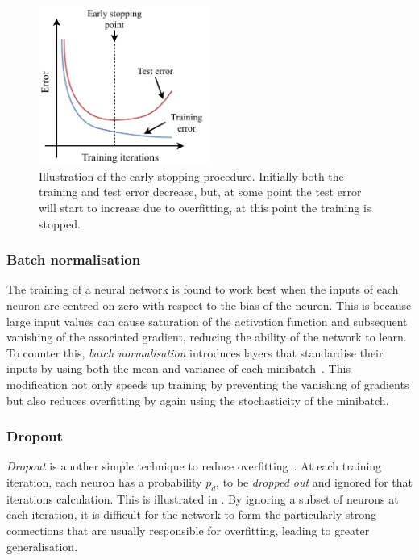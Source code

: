 \begin{figure} %
    \includegraphics[width=0.5\textwidth]{diagrams/6-cnn/early_stopping.pdf}
    \caption[Illustration of the early stopping procedure]
    {Illustration of the early stopping procedure. Initially both the training and test error
        decrease, but, at some point the test error will start to increase due to overfitting, at
        this point the training is stopped.}
    \label{fig:early_stopping}
\end{figure}

\subsubsection*{Batch normalisation} %

The training of a neural network is found to work best when the inputs of each neuron are centred
on zero with respect to the bias of the neuron. This is because large input values can cause
saturation of the activation function and subsequent vanishing of the associated gradient,
reducing the ability of the network to learn. To counter this, \emph{batch normalisation}
introduces layers that standardise their inputs by using both the mean and variance of each
minibatch~\cite{ioffe2015}. This modification not only speeds up training by preventing the
vanishing of gradients but also reduces overfitting by again using the stochasticity of the
minibatch.

\subsubsection*{Dropout} %

\emph{Dropout} is another simple technique to reduce overfitting~\cite{hinton2012}. At each
training iteration, each neuron has a probability $p_{d}$, to be \emph{dropped out} and ignored
for that iterations calculation. This is illustrated in . By ignoring a
subset of neurons at each iteration, it is difficult for the network to form the particularly
strong connections that are usually responsible for overfitting, leading to greater
generalisation.


